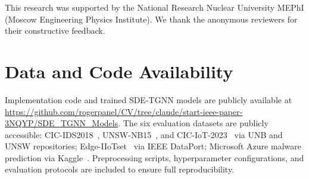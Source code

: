 \documentclass[10pt,journal,compsoc]{IEEEtran}
\begin{document}
This research was supported by the National Research Nuclear University MEPhI (Moscow Engineering Physics Institute). We thank the anonymous reviewers for their constructive feedback.

\vspace{-0.2cm}
\section*{Data and Code Availability}

Implementation code and trained SDE-TGNN models are publicly available at \url{https://github.com/rogerpanel/CV/tree/claude/start-ieee-paper-3NQYP/SDE_TGNN_Models}. The six evaluation datasets are publicly accessible: CIC-IDS2018~\cite{sharafaldin2018toward}, UNSW-NB15~\cite{moustafa2015unsw}, and CIC-IoT-2023~\cite{neto2023ciciot2023} via UNB and UNSW repositories; Edge-IIoTset~\cite{ferrag2022edge} via IEEE DataPort; Microsoft Azure malware prediction via Kaggle~\cite{microsoft2019malware}. Preprocessing scripts, hyperparameter configurations, and evaluation protocols are included to ensure full reproducibility.
\end{document}
